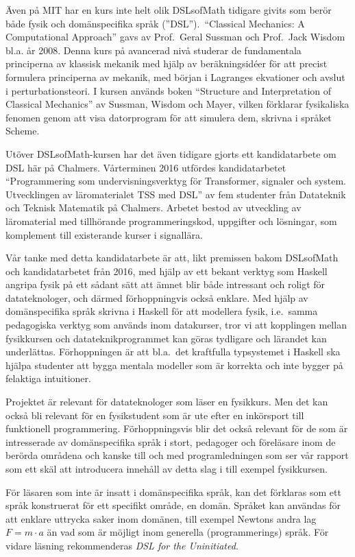 \begin{binge}
Även på MIT har en kurs inte helt olik DSLsofMath tidigare givits som berör både
fysik och domänspecifika språk (''DSL'').\ ``Classical Mechanics: A Computational Approach'' gavs av
Prof.\ Geral Sussman och Prof.\ Jack Wisdom bl.a. år
2008.\cite{classical-mechanics-course-mit-2008}
Denna kurs på avancerad nivå studerar de fundamentala principerna av klassisk
mekanik med hjälp av beräkningsidéer för att precist formulera principerna av
mekanik, med början i Lagranges ekvationer och avslut i
perturbationsteori. I kursen används boken ``Structure and
Interpretation of Classical Mechanics'' av Sussman, Wisdom och Mayer,
vilken förklarar fysikaliska fenomen genom att visa datorprogram för att
simulera dem, skrivna i språket Scheme.\cite{SICM}

Utöver DSLsofMath-kursen har det även tidigare gjorts ett kandidatarbete om DSL 
här på Chalmers. Vårterminen 2016 utfördes kandidatarbetet
``Programmering som undervisningsverktyg för Transformer, signaler och
system. Utvecklingen av läromaterialet TSS med DSL'' av fem studenter
från Datateknik och Teknisk Matematik på Chalmers. Arbetet bestod av
utveckling av läromaterial med tillhörande programmeringskod,
uppgifter och lösningar, som komplement till existerande kurser i
signallära.\cite{kandidat2016}

Vår tanke med detta kandidatarbete är att, likt premissen bakom DSLsofMath
och kandidatarbetet från 2016, med hjälp av ett bekant verktyg
som Haskell angripa fysik på ett sådant sätt att ämnet blir både
intressant och roligt för datateknologer, och därmed förhoppningvis
också enklare. Med hjälp av domänspecifika språk skrivna i Haskell för att
modellera fysik, i.e.\ samma pedagogiska verktyg som används inom
datakurser, tror vi att kopplingen mellan fysikkursen och
datateknikprogrammet kan göras tydligare och lärandet kan underlättas.
Förhoppningen är att bl.a.\ det kraftfulla typsystemet i Haskell ska
hjälpa studenter att bygga mentala modeller som är korrekta och inte
bygger på felaktiga intuitioner.

Projektet är relevant för datateknologer som läser en fysikkurs. Men
det kan också bli relevant för en fysikstudent som är ute efter en
inkörsport till funktionell programmering. Förhoppningsvis blir det
också relevant för de som är intresserade av domänspecifika språk i
stort, pedagoger och föreläsare inom de berörda områdena och kanske
till och med programledningen som ser vår rapport som ett skäl att
introducera innehåll av detta slag i till exempel fysikkursen.

För läsaren som inte är insatt i domänspecifika språk, kan det
förklaras som ett språk konstruerat för ett specifikt område, en
domän. Språket kan användas för att enklare uttrycka saker inom
domänen, till exempel Newtons andra lag $F=m \cdot a$ än vad som är
möjligt inom generella (programmerings) språk. För vidare läsning
rekommenderas \textit{DSL for the Uninitiated}.\cite{DSLU}
\end{binge}

